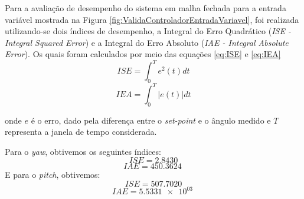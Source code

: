Para a avaliação de desempenho do sistema em malha fechada para a entrada variável mostrada na Figura \ref{fig:ValidaControladorEntradaVariavel}, foi realizada utilizando-se dois índices de desempenho, a Integral do Erro Quadrático (\textit{ISE - Integral Squared Error}) e a Integral do Erro Absoluto (\textit{IAE - Integral Absolute Error}). Os quais foram calculados por meio das equações \eqref{eq:ISE} e \eqref{eq:IEA}
 \begin{equation}\label{eq:ISE}
     ISE = \int_{0}^{T} e^{2}(t) dt
 \end{equation}
 \begin{equation}\label{eq:IEA}
     IEA = \int_{0}^{T} |e(t)| dt
 \end{equation}

\noindent onde $e$ é o erro, dado pela diferença entre o \textit{set-point} e o ângulo medido e $T$ representa a janela de tempo considerada.
 
Para o \textit{yaw}, obtivemos os seguintes índices:
$$ISE = 2.8430 $$
$$IAE = \SI{450.3624}{} $$
E para o \textit{pitch}, obtivemos:
$$ISE = 507.7020 $$
$$IAE = \SI{5.5331e+03}{} $$

